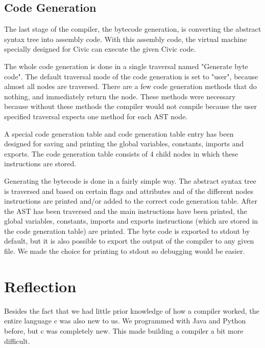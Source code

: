 \documentclass[hidelinks]{uva-inf-article}
\begin{document}
\newpage
\subsection{Code Generation}
\par The last stage of the compiler, the bytecode generation, is converting the abstract syntax tree into assembly code. 
With this assembly code, the virtual machine specially designed for Civic can execute the given Civic code.

\par The whole code generation is done in a single traversal named "Generate byte code".
The default traversal mode of the code generation is set to "user", because almost all nodes are traversed.
There are a few code generation methods that do nothing, and immediately return the node. 
These methods were necessary because without these methods the compiler would not compile because the user specified traversal expects one method for each AST node.

\par A special code generation table and code generation table entry has been designed for saving and printing the global variables, constants, imports and exports. 
The code generation table consists of 4 child nodes in which these instructions are stored.

\par Generating the bytecode is done in a fairly simple way.
The abstract syntax tree is traversed and based on certain flags and attributes and of the different 
nodes instructions are printed and/or added to the correct code generation table.
After the AST has been traversed and the main instructions have been printed, the global variables, constants, 
imports and exports instructions (which are stored in the code generation table) are printed.
The byte code is exported to stdout by default, but it is also possible to export the output of the compiler to any given file.
We made the choice for printing to stdout so debugging would be easier. 

\newpage
\section{Reflection}
\par Besides the fact that we had little prior knowledge of how a compiler worked, the entire language c was also new to us.
We programmed with Java and Python before, but c was completely new. This made building a compiler a bit more difficult.
\end{document}
